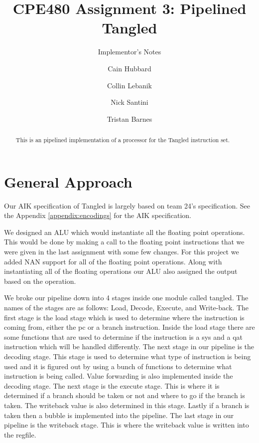 \documentclass[sigconf, nonacm=true, screen=true]{acmart}
\begin{document}
\title{CPE480 Assignment 3: Pipelined Tangled }
\subtitle{Implementor's Notes}

\author{Cain Hubbard}
\author{Collin Lebanik}
\author{Nick Santini}
\author{Tristan Barnes}


\begin{abstract}
This is an pipelined implementation of a processor for the Tangled instruction set.
\end{abstract}


\maketitle


\section{General Approach}

Our AIK specification of Tangled is largely based on team 24's specification. See the Appendix \ref{appendix:encodings} for the AIK specification. 

We designed an ALU which would instantiate all the floating point operations. This would be done by making a call to the floating point instructions that we were given in the last assignment with some few changes. For this project we added NAN support for all of the floating point operations. Along with instantiating all of the floating operations our ALU also assigned the output based on the operation.  

We broke our pipeline down into 4 stages inside one module called tangled. The names of the stages are as follows: Load, Decode, Execute, and Write-back. The first stage is the load stage which is used to determine where the instruction is coming from, either the pc or a branch instruction. Inside the load stage there are some functions that are used to determine if the instruction  is a sys and a qat instruction which will be handled differently. The next stage in our pipeline is the decoding stage. This stage is used to determine what type of instruction is being used and it is figured out by using a bunch of functions to determine what instruction is being called. Value forwarding is also implemented inside the decoding stage. The next stage is the execute stage. This is where it is determined if a branch should be taken or not and where to go if the branch is taken. The writeback value is also determined in this stage. Lastly if a branch is taken then a bubble is implemented into the pipeline. The last stage in our pipeline is the writeback stage. This is where the writeback value is written into the regfile.
\end{document}
